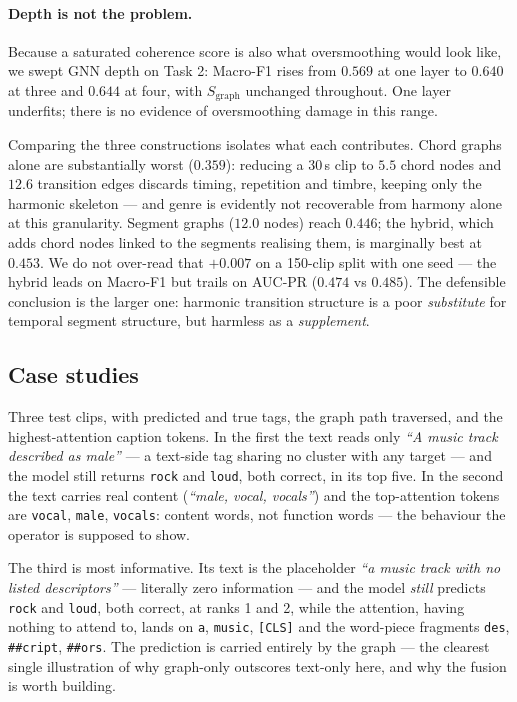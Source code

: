 \documentclass[10pt]{article}
\begin{document}
\paragraph{Depth is not the problem.} Because a saturated coherence score is also
what oversmoothing would look like, we swept GNN depth on Task 2: Macro-F1 rises
from $0.569$ at one layer to $0.640$ at three and $0.644$ at four, with
$S_{\text{graph}}$ unchanged throughout. One layer underfits; there is no
evidence of oversmoothing damage in this range.



Comparing the three constructions isolates what each contributes. Chord graphs
alone are substantially worst ($0.359$): reducing a 30\,s clip to $5.5$ chord
nodes and $12.6$ transition edges discards timing, repetition and timbre,
keeping only the harmonic skeleton --- and genre is evidently not recoverable
from harmony alone at this granularity. Segment graphs ($12.0$ nodes) reach
$0.446$; the hybrid, which adds chord nodes linked to the segments realising
them, is marginally best at $0.453$. We do not over-read that $+0.007$ on a
150-clip split with one seed --- the hybrid leads on Macro-F1 but trails on
AUC-PR ($0.474$ vs $0.485$). The defensible conclusion is the larger one:
harmonic transition structure is a poor \emph{substitute} for temporal segment
structure, but harmless as a \emph{supplement}.

\subsection{Case studies}
\label{sec:cases}

Three test clips, with predicted and true tags, the graph path traversed, and
the highest-attention caption tokens. In the first the text reads only
\emph{``A music track described as male''} --- a text-side tag sharing no cluster
with any target --- and the model still returns \texttt{rock} and \texttt{loud},
both correct, in its top five. In the second the text carries real content
(\emph{``male, vocal, vocals''}) and the top-attention tokens are
\texttt{vocal}, \texttt{male}, \texttt{vocals}: content words, not function words
--- the behaviour the operator is supposed to show.

The third is most informative. Its text is the placeholder \emph{``a music track
with no listed descriptors''} --- literally zero information --- and the model
\emph{still} predicts \texttt{rock} and \texttt{loud}, both correct, at ranks 1
and 2, while the attention, having nothing to attend to, lands on \texttt{a},
\texttt{music}, \texttt{[CLS]} and the word-piece fragments \texttt{des},
\texttt{\#\#cript}, \texttt{\#\#ors}. The prediction is carried entirely by the
graph --- the clearest single illustration of why graph-only outscores text-only
here, and why the fusion is worth building.
\end{document}

